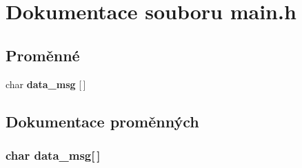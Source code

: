 \section{Dokumentace souboru main.h}
\label{main_8h}
\subsection*{Proměnné}
\begin{CompactItemize}
\item 
char {\bf data\_\-msg} [$\,$]
\end{CompactItemize}


\subsection{Dokumentace proměnných}
\subsubsection{\setlength{\rightskip}{0pt plus 5cm}char {\bf data\_\-msg}[$\,$]}\label{main_8h_764149ca67e94a94945b60d4c93863d0}


